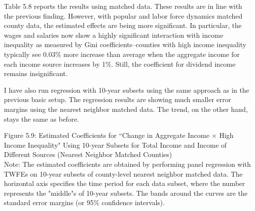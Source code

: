 \documentclass{article}
\begin{document}
Table 5.8 reports the results using matched data. These results are in line with the previous finding. However, with popular and labor force dynamics matched county data, the estimated effects are being more significant. In particular, the wages and salaries now show a highly significant interaction with income inequality as measured by Gini coefficients--counties with high income inequality typically see 0.03\% more increase than average when the aggregate income for each income source increases by 1\%. Still, the coefficient for dividend income remains insignificant. 

I have also run regression with 10-year subsets using the same approach as in the previous basic setup. The regression results are showing much smaller error margins using the nearest neighbor matched data. The trend, on the other hand, stays the same as before. 

\pagebreak

\begin{center}
Figure 5.9: Estimated Coefficients for ``Change in Aggregate Income $\times$ High Income Inequality" Using 10-year Subsets for Total Income and Income of Different Sources (Nearest Neighbor Matched Counties)\\
\noindent
{}
Note: The estimated coefficients are obtained by performing panel regression with TWFEs on 10-year subsets of county-level nearest neighbor matched data. The horizontal axis specifies the time period for each data subset, where the number represents the "middle"s of 10-year subsets. The bands around the curves are the standard error margins (or 95\% confidence intervals).
\end{center}
\end{document}
